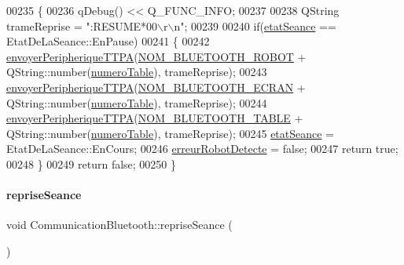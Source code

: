 \begin{DoxyCode}
00235 \{
00236     qDebug() << Q\_FUNC\_INFO;
00237 
00238     QString trameReprise = \textcolor{stringliteral}{":RESUME*00\(\backslash\)r\(\backslash\)n"};
00239 
00240     \textcolor{keywordflow}{if}(\hyperlink{class_communication_bluetooth_adc66f3034d46f3964a26b62ad98e784f}{etatSeance} == EtatDeLaSeance::EnPause)
00241     \{
00242         \hyperlink{class_communication_bluetooth_a73d95b841bf64a4463760435a41fc219}{envoyerPeripheriqueTTPA}(\hyperlink{terminal-_t_t_p_a_2communicationbluetooth_8h_a47332bb9b30ed8b0f38fa7b5bd11fd47}{NOM\_BLUETOOTH\_ROBOT} + 
      QString::number(\hyperlink{class_communication_bluetooth_a9428f8261f0cc055e9c6fed9a61cb595}{numeroTable}), trameReprise);
00243         \hyperlink{class_communication_bluetooth_a73d95b841bf64a4463760435a41fc219}{envoyerPeripheriqueTTPA}(\hyperlink{terminal-_t_t_p_a_2communicationbluetooth_8h_a2bd8beaaf0c4b59979a3f78d4c134ec8}{NOM\_BLUETOOTH\_ECRAN} + 
      QString::number(\hyperlink{class_communication_bluetooth_a9428f8261f0cc055e9c6fed9a61cb595}{numeroTable}), trameReprise);
00244         \hyperlink{class_communication_bluetooth_a73d95b841bf64a4463760435a41fc219}{envoyerPeripheriqueTTPA}(\hyperlink{terminal-_t_t_p_a_2communicationbluetooth_8h_aa416b2be7573de0d7832248a27ba09a8}{NOM\_BLUETOOTH\_TABLE} + 
      QString::number(\hyperlink{class_communication_bluetooth_a9428f8261f0cc055e9c6fed9a61cb595}{numeroTable}), trameReprise);
00245         \hyperlink{class_communication_bluetooth_adc66f3034d46f3964a26b62ad98e784f}{etatSeance} = EtatDeLaSeance::EnCours;
00246         \hyperlink{class_communication_bluetooth_a0ceb51c44da6c7479b46ae8e737e1541}{erreurRobotDetecte} = \textcolor{keyword}{false};
00247         \textcolor{keywordflow}{return} \textcolor{keyword}{true};
00248     \}
00249     \textcolor{keywordflow}{return} \textcolor{keyword}{false};
00250 \}
\end{DoxyCode}
\mbox{\label{class_communication_bluetooth_a332792330a61464c655c99e6379238c1}} 
\paragraph{\texorpdfstring{reprise\+Seance}{repriseSeance}}
{\footnotesize\ttfamily void Communication\+Bluetooth\+::reprise\+Seance (\begin{DoxyParamCaption}{ }\end{DoxyParamCaption})\hspace{0.3cm}{\ttfamily [signal]}}



